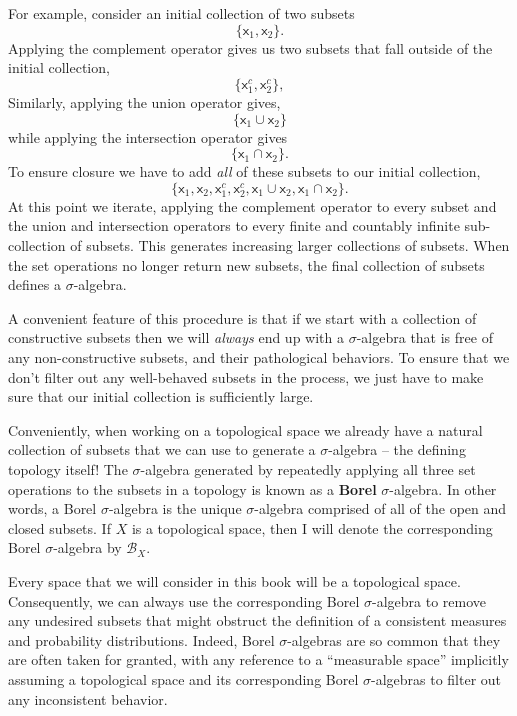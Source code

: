 \documentclass[
  letterpaper,
  DIV=11,
  numbers=noendperiod]{scrartcl}
\begin{document}
For example, consider an initial collection of two subsets \[
\{ \mathsf{x}_1, \mathsf{x}_2 \}.
\] Applying the complement operator gives us two subsets that fall
outside of the initial collection, \[
\{ \mathsf{x}_1^c, \mathsf{x}_2^c \},
\] Similarly, applying the union operator gives, \[
\{ \mathsf{x}_1 \cup \mathsf{x}_2 \}
\] while applying the intersection operator gives \[
\{ \mathsf{x}_1 \cap \mathsf{x}_2 \}.
\] To ensure closure we have to add \emph{all} of these subsets to our
initial collection, \[
\{ \mathsf{x}_1, \mathsf{x}_2, \mathsf{x}_1^c, \mathsf{x}_2^c,
   \mathsf{x}_1 \cup \mathsf{x}_2, \mathsf{x}_1 \cap \mathsf{x}_2 \}.
\] At this point we iterate, applying the complement operator to every
subset and the union and intersection operators to every finite and
countably infinite sub-collection of subsets. This generates increasing
larger collections of subsets. When the set operations no longer return
new subsets, the final collection of subsets defines a
\(\sigma\)-algebra.

A convenient feature of this procedure is that if we start with a
collection of constructive subsets then we will \emph{always} end up
with a \(\sigma\)-algebra that is free of any non-constructive subsets,
and their pathological behaviors. To ensure that we don't filter out any
well-behaved subsets in the process, we just have to make sure that our
initial collection is sufficiently large.

Conveniently, when working on a topological space we already have a
natural collection of subsets that we can use to generate a
\(\sigma\)-algebra -- the defining topology itself! The
\(\sigma\)-algebra generated by repeatedly applying all three set
operations to the subsets in a topology is known as a \textbf{Borel}
\(\sigma\)-algebra. In other words, a Borel \(\sigma\)-algebra is the
unique \(\sigma\)-algebra comprised of all of the open and closed
subsets. If \(X\) is a topological space, then I will denote the
corresponding Borel \(\sigma\)-algebra by \(\mathcal{B}_{X}\).

Every space that we will consider in this book will be a topological
space. Consequently, we can always use the corresponding Borel
\(\sigma\)-algebra to remove any undesired subsets that might obstruct
the definition of a consistent measures and probability distributions.
Indeed, Borel \(\sigma\)-algebras are so common that they are often
taken for granted, with any reference to a ``measurable space''
implicitly assuming a topological space and its corresponding Borel
\(\sigma\)-algebras to filter out any inconsistent behavior.
\end{document}
